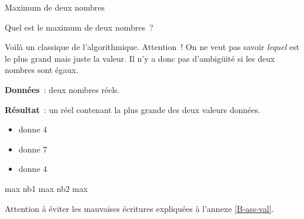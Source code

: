 \begin{Fiche}{Maximum de deux nombres}
\label{fiche:max2nb}

	Quel est le maximum de deux nombres~?


	Voilà un classique de l’algorithmique.
	Attention~! On ne veut pas savoir \emph{lequel}
	est le plus grand mais juste la valeur.
	Il n’y a donc pas d’ambigüité si les deux nombres sont égaux.

	\textbf{Données}~: deux nombres réels.
		
	\textbf{Résultat}~: un réel contenant la plus grande des deux valeurs données.

	\begin{center}	
	\end{center}


	\vspace*{-3mm}
	\begin{multicols}{3}
		\begin{itemize}
		\item {} donne $4$
		\item {} donne $7$
		\item {} donne $4$
		\end{itemize}
	\end{multicols}
	\vspace*{-6mm}
	

	\begin{LDA}
			\Let max \Gets nb1
		\Else
			\Let max \Gets nb2
		\EndIf
		\Return max
	\EndAlgo
	\end{LDA}

	Attention à éviter les mauvaises écritures 
	expliquées à l’annexe \vref{B-ass-val}.




\end{Fiche}
